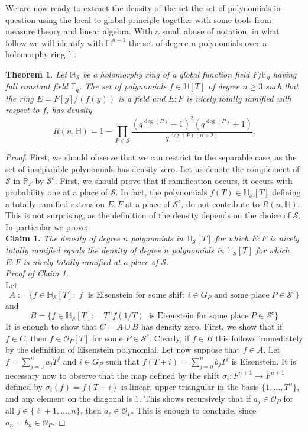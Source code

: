 \documentclass[10pt]{amsart}
\newcommand{\vF}{\mathbb{F}}
\newcommand{\vH}{\mathbb{H}}
\newcommand{\vP}{\mathbb{P}}
\newcommand{\cO}{\mathcal{O}}
\newcommand{\cS}{\mathcal{S}}
\newtheorem{theorem}{Theorem}[section]
\theoremstyle{definition}
\theoremstyle{remark}
\numberwithin{equation}{section}
\begin{document}
We are now ready to extract the density of the set the set of polynomials in question using the local to global principle together with some tools from measure theory and linear algebra. With a small abuse of notation, in what follow we will identify with $\vH^{n+1}$ the set of degree $n$ polynomials over a holomorphy ring $\vH$.
\begin{theorem}\label{thm:probabilitytotramextension}
Let $\vH_{\cS}$ be a holomorphy ring of a global function field $F/\mathbb F_q$ having full constant field $\vF_q$. The set of polynomials $f\in \vH[T]$ of degree $n\geq  3$ such that the ring $E=F[y]/(f(y))$ is a field and  $E:F$ is nicely totally ramified with respect to $f$, has density 
\[R(n,\vH)=1-\prod_{P\in \cS} \frac{(q^{\deg(P)}-1)^2(q^{\deg(P)}+1)}{q^{\deg(P)(n+2)}}.\]
\end{theorem}
\begin{proof} 
First, we should observe that we can restrict to the separable case, as the set of inseparable polynomials has density zero. 
Let us denote  the complement of $\cS$ in $\vP_F$ by $\cS^c$.
First, we should prove that if ramification occurs, it occurs with probability one at a place of $\cS$. In fact, the polynomials $f(T) \in \vH_{\cS}[T]$ defining a totally ramified extension $E:F$ at a place of $\cS^c$, do not contribute to  $R(n,\vH)$. This is not surprising, as the definition of the density depends on the choice of $\cS$. In particular we prove:
\\ \textbf{Claim 1.} \emph{The density of degree $n$ polynomials in $\vH_{\cS}[T]$ for which $E:F$ is nicely totally ramified equals the density of degree $n$ polynomials in $\vH_{\cS}[T]$ for which $E:F$ is nicely totally ramified at a place of $\cS$.}\\
\emph{Proof of Claim 1.}\\
Let \[A:=\{f\in \vH_{\cS}[T]: \; f \; \mbox{ is Eisenstein for some shift $i\in G_P$ and some place}\; P\in \cS^c \}\]
and 
\[B=\{f\in \vH_{\cS}[T]: \quad T^nf(1/T) \; \mbox{ is Eisenstein for some place}\; P\in \cS^c \}\]  
It is enough to show that $C=A\cup B$ has density zero.
First, we show that if $f\in C$, then $f\in \cO_P[T]$ for some 
$P\in \cS^c$. 
Clearly, if $f\in B$ this follows immediately by the definition of Eisenstein polynomial. Let now suppose that 
$f\in A$. Let $f=\sum^n_{j=0}a_j T^j$ and $i\in G_P$ such that $f(T+i)=\sum^n_{j=0}b_j T^j$ is Eisenstein.
It is necessary now to observe that  the map defined by the shift $\sigma_i: F^{n+1}\longrightarrow F^{n+1}$ defined by $\sigma_i(f)=f(T+i)$ is linear, upper triangular in the basis $\{1,\dots, T^n\}$, and any element on the diagonal is $1$. This shows recursively that if $a_{j}\in \cO_P$ for all $j\in \{\ell+1, \dots, n\}$, then $a_{\ell}\in \cO_P$. This is enough to conclude, since $a_n=b_n\in \cO_P$.


\end{proof}
\end{document}
